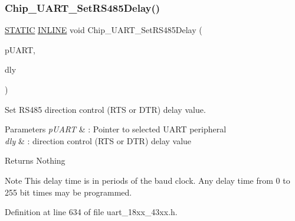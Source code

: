 \subsubsection{\texorpdfstring{Chip\+\_\+\+U\+A\+R\+T\+\_\+\+Set\+R\+S485\+Delay()}{Chip\_UART\_SetRS485Delay()}}
{\footnotesize\ttfamily \hyperlink{group___l_p_c___types___public___macros_ga10b2d890d871e1489bb02b7e70d9bdfb}{S\+T\+A\+T\+IC} \hyperlink{spifi__18xx__43xx_8h_a2eb6f9e0395b47b8d5e3eeae4fe0c116}{I\+N\+L\+I\+NE} void Chip\+\_\+\+U\+A\+R\+T\+\_\+\+Set\+R\+S485\+Delay (\begin{DoxyParamCaption}\item[{\hyperlink{struct_l_p_c___u_s_a_r_t___t}{L\+P\+C\+\_\+\+U\+S\+A\+R\+T\+\_\+T} $\ast$}]{p\+U\+A\+RT,  }\item[{uint8\+\_\+t}]{dly }\end{DoxyParamCaption})}



Set R\+S485 direction control (R\+TS or D\+TR) delay value. 


\begin{DoxyParams}{Parameters}
{\em p\+U\+A\+RT} & \+: Pointer to selected U\+A\+RT peripheral \\
\hline
{\em dly} & \+: direction control (R\+TS or D\+TR) delay value \\
\hline
\end{DoxyParams}
\begin{DoxyReturn}{Returns}
Nothing 
\end{DoxyReturn}
\begin{DoxyNote}{Note}
This delay time is in periods of the baud clock. Any delay time from 0 to 255 bit times may be programmed. 
\end{DoxyNote}


Definition at line 634 of file uart\+\_\+18xx\+\_\+43xx.\+h.

\mbox{\label{group___u_a_r_t__18_x_x__43_x_x_ga0bf41455dd390ae86f95f4bfe43a49a2}} 
